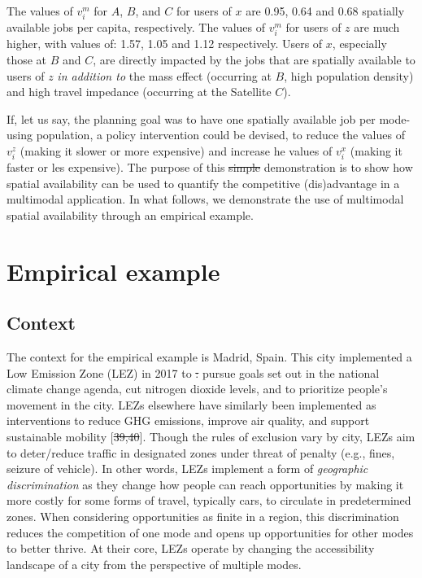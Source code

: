 \documentclass[10pt,letterpaper]{article}
\providecommand{\DIFaddtex}[1]{{\protect\color{blue}\uwave{#1}}} %
\providecommand{\DIFdeltex}[1]{{\protect\color{red}\sout{#1}}}                      %
\providecommand{\DIFaddbegin}{} %
\providecommand{\DIFaddend}{} %
\providecommand{\DIFdelbegin}{} %
\providecommand{\DIFdelend}{} %
\providecommand{\DIFadd}[1]{\texorpdfstring{\DIFaddtex{#1}}{#1}} %
\providecommand{\DIFdel}[1]{\texorpdfstring{\DIFdeltex{#1}}{}} %
\newcommand{\DIFscaledelfig}{0.5}
\newlength{\DIFdelgraphicswidth} %
\newlength{\DIFdelgraphicsheight} %
\newcommand{\DIFaddincludegraphics}[2][]{{\color{blue}\fbox{\DIFOincludegraphics[#1]{#2}}}} %
\newcommand{\DIFdelincludegraphics}[2][]{%
\sbox{\DIFdelgraphicsbox}{\DIFOincludegraphics[#1]{#2}}%
\settoboxwidth{\DIFdelgraphicswidth}{\DIFdelgraphicsbox} %
\settoboxtotalheight{\DIFdelgraphicsheight}{\DIFdelgraphicsbox} %
\scalebox{\DIFscaledelfig}{%
\parbox[b]{\DIFdelgraphicswidth}{\usebox{\DIFdelgraphicsbox}\\[-\baselineskip] \rule{\DIFdelgraphicswidth}{0em}}\llap{\resizebox{\DIFdelgraphicswidth}{\DIFdelgraphicsheight}{%
\setlength{\unitlength}{\DIFdelgraphicswidth}%
\begin{picture}(1,1)%
\thicklines\linethickness{2pt} %
{\color[rgb]{1,0,0}\put(0,0){\framebox(1,1){}}}%
{\color[rgb]{1,0,0}\put(0,0){\line( 1,1){1}}}%
{\color[rgb]{1,0,0}\put(0,1){\line(1,-1){1}}}%
\end{picture}%
}\hspace*{3pt}}} %
} %
\DeclareRobustCommand{\DIFaddbegin}{\DIFOaddbegin \let\includegraphics\DIFaddincludegraphics} %
\DeclareRobustCommand{\DIFaddend}{\DIFOaddend \let\includegraphics\DIFOincludegraphics} %
\DeclareRobustCommand{\DIFdelbegin}{\DIFOdelbegin \let\includegraphics\DIFdelincludegraphics} %
\DeclareRobustCommand{\DIFdelend}{\DIFOaddend \let\includegraphics\DIFOincludegraphics} %
\begin{document}
The values of \(v_i^m\) for \(A\), \(B\), and \(C\) for users of \(x\)
are 0.95, 0.64 and 0.68 spatially available jobs per capita,
respectively. The values of \(v_i^m\) for users of \(z\) are much
higher, with values of: 1.57, 1.05 and 1.12 respectively. Users of
\(x\), especially those at \(B\) and \(C\), are directly impacted by the
jobs that are spatially available to users of \(z\) \emph{in addition
to} the mass effect (occurring at \(B\), high population density) and
high travel impedance (occurring at the Satellite \(C\)).

If, let us say, the planning goal was to have one spatially available
job per mode-using population, a policy intervention could be devised,
to reduce the values of \(v_i^z\) (making it slower or more expensive)
and increase he values of \(v_i^x\) (making it faster or les expensive).
The purpose of this \DIFdelbegin \DIFdel{simple }\DIFdelend \DIFaddbegin \DIFadd{synthetic }\DIFaddend demonstration is to show how spatial
availability can be used to quantify the competitive (dis)advantage in a
multimodal application. In what follows, we demonstrate the use of
multimodal spatial availability through an empirical example.

\hypertarget{empirical-example}{%
\section{Empirical example}\label{empirical-example}}

\hypertarget{context}{%
\subsection{Context}\label{context}}

The context for the empirical example is Madrid, Spain. This city
implemented a Low Emission Zone (LEZ) in 2017 to \DIFdelbegin \DIFdel{: }\DIFdelend pursue goals set out in
the national climate change agenda, cut nitrogen dioxide levels, and to
prioritize people's movement in the city. LEZs elsewhere have similarly
been implemented as interventions to reduce GHG emissions, improve air
quality, and support sustainable mobility {[}\DIFdelbegin \DIFdel{39,40}\DIFdelend \DIFaddbegin \DIFadd{50,51}\DIFaddend {]}. Though the rules
of exclusion vary by city, LEZs aim to deter/reduce traffic in
designated zones under threat of penalty (e.g., fines, seizure of
vehicle). In other words, LEZs implement a form of \emph{geographic
discrimination} as they change how people can reach opportunities by
making it more costly for some forms of travel, typically cars, to
circulate in predetermined zones. When considering opportunities as
finite in a region, this discrimination reduces the competition of one
mode and opens up opportunities for other modes to better thrive. At
their core, LEZs operate by changing the accessibility landscape of a
city from the perspective of multiple modes.
\end{document}
